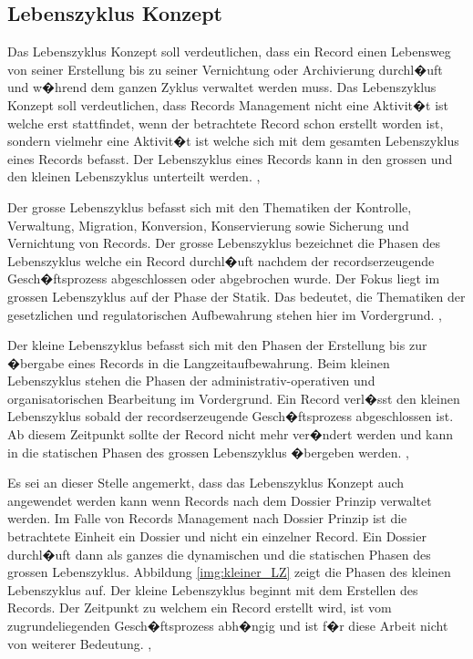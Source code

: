 \documentclass[a4paper,twoside,10pt]{report}
\begin{document}
\subsection{Lebenszyklus Konzept}
Das Lebenszyklus Konzept soll verdeutlichen, dass ein Record einen Lebensweg von seiner Erstellung bis zu seiner Vernichtung oder Archivierung durchl�uft und w�hrend dem ganzen Zyklus verwaltet werden muss. Das Lebenszyklus Konzept soll verdeutlichen, dass Records Management nicht eine Aktivit�t ist welche erst stattfindet, wenn der betrachtete Record schon erstellt worden ist, sondern vielmehr eine Aktivit�t ist welche sich mit dem gesamten Lebenszyklus eines Records befasst. Der Lebenszyklus eines Records kann in den grossen und den kleinen Lebenszyklus unterteilt werden. \cite{rmGest}, \cite{rmHandbook}

Der grosse Lebenszyklus befasst sich mit den Thematiken der Kontrolle, Verwaltung, Migration, Konversion, Konservierung sowie Sicherung und Vernichtung von Records. Der grosse Lebenszyklus bezeichnet die Phasen des Lebenszyklus welche ein Record durchl�uft nachdem der recordserzeugende Gesch�ftsprozess abgeschlossen oder abgebrochen wurde. Der Fokus liegt im grossen Lebenszyklus auf der Phase der Statik. Das bedeutet, die Thematiken der gesetzlichen und regulatorischen Aufbewahrung stehen hier im Vordergrund. \cite{rmGest}, \cite{rmHandbook}

Der kleine Lebenszyklus befasst sich mit den Phasen der Erstellung bis zur �bergabe eines Records in die Langzeitaufbewahrung. Beim kleinen Lebenszyklus stehen die Phasen der administrativ-operativen und organisatorischen Bearbeitung im Vordergrund. Ein Record verl�sst den kleinen Lebenszyklus sobald der recordserzeugende Gesch�ftsprozess abgeschlossen ist. Ab diesem Zeitpunkt sollte der Record nicht mehr ver�ndert werden und kann in die statischen Phasen des grossen Lebenszyklus �bergeben werden. \cite{rmGest}, \cite{rmHandbook} 

Es sei an dieser Stelle angemerkt, dass das Lebenszyklus Konzept auch angewendet werden kann wenn Records nach dem Dossier Prinzip verwaltet werden. Im Falle von Records Management nach Dossier Prinzip ist die betrachtete Einheit ein Dossier und nicht ein einzelner Record. Ein Dossier durchl�uft dann als ganzes die dynamischen und die statischen Phasen des grossen Lebenszyklus. Abbildung \ref{img:kleiner_LZ} zeigt die Phasen des kleinen Lebenszyklus auf. Der kleine Lebenszyklus beginnt mit dem Erstellen des Records. Der Zeitpunkt zu welchem ein Record erstellt wird, ist vom zugrundeliegenden Gesch�ftsprozess abh�ngig und ist f�r diese Arbeit nicht von weiterer Bedeutung. \cite{rmGest}, \cite{rmHandbook}
\end{document}
